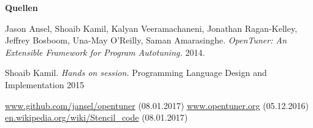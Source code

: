 \begin{frame}

  \textbf{Quellen \newline}
      
  \begin{thebibliography}{9}

   
   
   Jason Ansel, Shoaib Kamil, Kalyan Veeramachaneni, Jonathan Ragan-Kelley, Jeffrey Bosboom, Una-May O'Reilly, Saman Amarasinghe. \emph{OpenTuner: An Extensible Framework for Program Autotuning.}
    2014.
    
  
   Shoaib Kamil. \emph{Hands on session.} Programming Language Design and Implementation 2015
  
   \url{www.github.com/jansel/opentuner} \footnotesize (08.01.2017)
  \normalsize
   \url{www.opentuner.org} \footnotesize (05.12.2016)
  \normalsize
   \url{en.wikipedia.org/wiki/Stencil_code} \footnotesize (08.01.2017)

  \end{thebibliography}

\end{frame}
\endgroup


